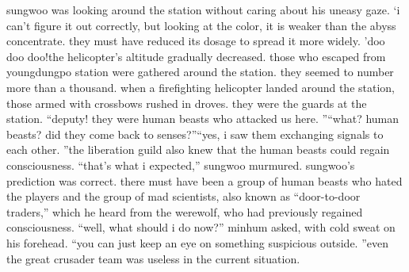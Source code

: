  sungwoo was looking around the station without caring about his uneasy gaze.
‘i can’t figure it out correctly, but looking at the color, it is weaker than the abyss concentrate.
 they must have reduced its dosage to spread it more widely.
’doo doo doo!the helicopter’s altitude gradually decreased.
 those who escaped from youngdungpo station were gathered around the station.
 they seemed to number more than a thousand.
when a firefighting helicopter landed around the station, those armed with crossbows rushed in droves.
 they were the guards at the station.
“deputy! they were human beasts who attacked us here.
”“what? human beasts? did they come back to senses?”“yes, i saw them exchanging signals to each other.
”the liberation guild also knew that the human beasts could regain consciousness.
“that’s what i expected,” sungwoo murmured.
sungwoo’s prediction was correct.
 there must have been a group of human beasts who hated the players and the group of mad scientists, also known as “door-to-door traders,” which he heard from the werewolf, who had previously regained consciousness.
“well, what should i do now?” minhum asked, with cold sweat on his forehead.
“you can just keep an eye on something suspicious outside.
”even the great crusader team was useless in the current situation.

